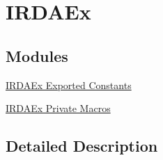 \hypertarget{group___i_r_d_a_ex}{}\section{I\+R\+D\+A\+Ex}
\label{group___i_r_d_a_ex}
\subsection*{Modules}
\begin{DoxyCompactItemize}
\item 
\hyperlink{group___i_r_d_a_ex___exported___constants}{I\+R\+D\+A\+Ex Exported Constants}
\item 
\hyperlink{group___i_r_d_a_ex___private___macros}{I\+R\+D\+A\+Ex Private Macros}
\end{DoxyCompactItemize}


\subsection{Detailed Description}
